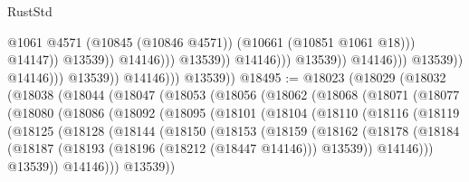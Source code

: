 \begin{lexlean}{RustStd}
\begin{coremodule}
                                                                @1061
                                                                @4571
                                                                (@10845 (@10846 @4571))
                                                                (@10661 (@10851 @1061 @18)))
                                                              @14147))
                                                          @13539))
                                                      @14146)))
                                                @13539))
                                            @14146)))
                                      @13539))
                                  @14146)))
                            @13539))
                        @14146)))
                  @13539))
              @14146)))
        @13539))
@18495 := @18023
    (@18029
      (@18032
        (@18038
          (@18044
            (@18047
              (@18053
                (@18056
                  (@18062
                    (@18068
                      (@18071
                        (@18077
                          (@18080
                            (@18086
                              (@18092
                                (@18095
                                  (@18101
                                    (@18104
                                      (@18110
                                        (@18116
                                          (@18119
                                            (@18125
                                              (@18128
                                                (@18144
                                                  (@18150
                                                    (@18153
                                                      (@18159
                                                        (@18162
                                                          (@18178
                                                            (@18184
                                                              (@18187
                                                                (@18193
                                                                  (@18196 (@18212 (@18447 @14146)))
                                                                  @13539))
                                                              @14146)))
                                                        @13539))
                                                    @14146)))
                                              @13539))

\end{coremodule}
\end{lexlean}

